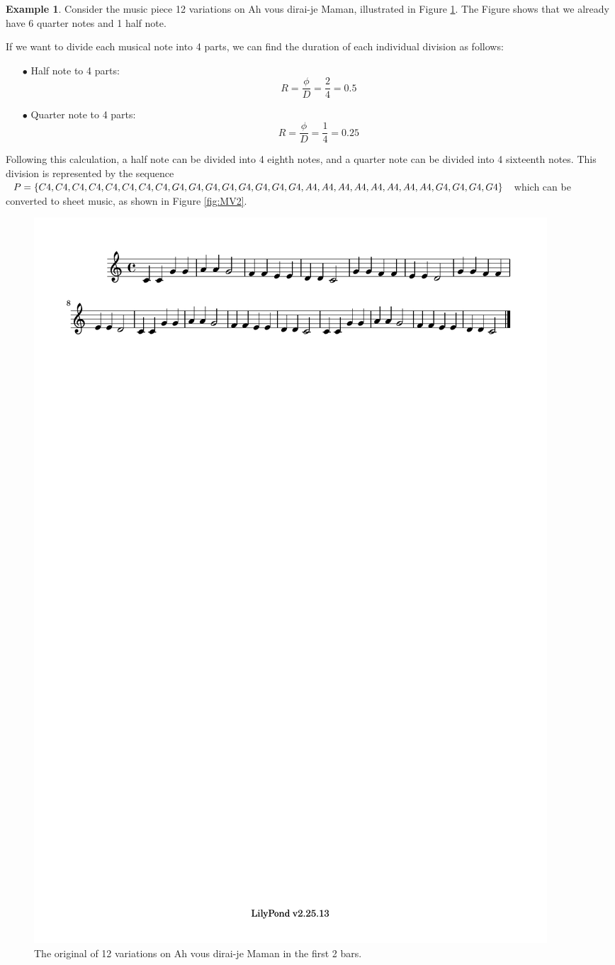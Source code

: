 \documentclass[11pt]{article}
\theoremstyle{definition}
\newtheorem{example}[theorem]{Example}
\begin{document}
\begin{example}
Consider the music piece 12 variations on Ah vous dirai-je Maman, illustrated in Figure \ref{fig:MV1}. The Figure shows that we already have 6 quarter notes and 1 half note.

If we want to divide each musical note into 4 parts, we can find the duration of each individual division as follows:
\begin{enumerate}
  \item[$\bullet$] Half note to 4 parts: $$R = \frac{\phi}{D} = \frac{2}{4} = 0.5$$
  \item[$\bullet$] Quarter note to 4 parts: $$R = \frac{\phi}{D} = \frac{1}{4} = 0.25$$
\end{enumerate}

Following this calculation, a half note can be divided into 4 eighth notes, and a quarter note can be divided into 4 sixteenth notes. This division is represented by the sequence \\ $P = \{C4, C4, C4, C4, C4, C4, C4, C4, G4, G4, G4, G4, G4, G4, G4, G4, A4, A4, A4, A4, A4, A4, \\ A4, A4, G4, G4, G4, G4 \}$ which can be converted to sheet music, as shown in Figure \ref{fig:MV2}.
\end{example}

\begin{figure}
\centering
\includegraphics[trim=1cm 26.5cm 12.35cm 0.02cm, clip, scale=1]{dabby_1.pdf}
\caption{The original of 12 variations on Ah vous dirai-je Maman in the first 2 bars.}
\label{fig:MV1} 
\end{figure}
\end{document}
